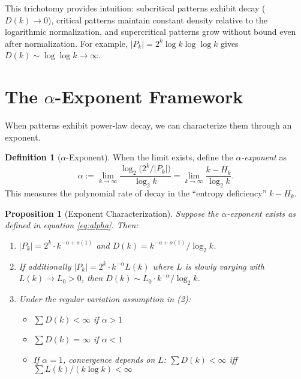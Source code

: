 \documentclass[11pt]{article}
\newtheorem{proposition}[theorem]{Proposition}
\theoremstyle{definition}
\newtheorem{definition}[theorem]{Definition}
\begin{document}
This trichotomy provides intuition: subcritical patterns exhibit decay ($D(k) \to 0$), critical patterns maintain constant density relative to the logarithmic normalization, and supercritical patterns grow without bound even after normalization. For example, $|P_k| = 2^k \log k \log\log k$ gives $D(k) \sim \log\log k \to \infty$.

\section{The $\alpha$-Exponent Framework}

When patterns exhibit power-law decay, we can characterize them through an exponent.

\begin{definition}[$\alpha$-Exponent]\label{def:alpha}
When the limit exists, define the \emph{$\alpha$-exponent} as
\begin{equation}\label{eq:alpha}
\alpha:=\lim_{k\to\infty}\frac{\log_2\big(2^k/|P_k|\big)}{\log_2 k} = \lim_{k\to\infty}\frac{k - H_k}{\log_2 k}.
\end{equation}
This measures the polynomial rate of decay in the ``entropy deficiency'' $k - H_k$.
\end{definition}

\begin{proposition}[Exponent Characterization]\label{prop:alpha-char}
Suppose the $\alpha$-exponent exists as defined in equation \eqref{eq:alpha}. Then:
\begin{enumerate}
\item $|P_k| = 2^k \cdot k^{-\alpha+o(1)}$ and $D(k) = k^{-\alpha+o(1)}/\log_2 k$.
\item If additionally $|P_k| = 2^k \cdot k^{-\alpha} L(k)$ where $L$ is slowly varying with $L(k) \to L_0 > 0$, then $D(k) \sim L_0 \cdot k^{-\alpha}/\log_2 k$.
\item Under the regular variation assumption in (2):
  \begin{itemize}
  \item $\sum D(k) < \infty$ if $\alpha > 1$
  \item $\sum D(k) = \infty$ if $\alpha < 1$
  \item If $\alpha = 1$, convergence depends on $L$: $\sum D(k) < \infty$ iff $\sum L(k)/(k\log k) < \infty$
  \end{itemize}
\end{enumerate}
\end{proposition}
\end{document}
